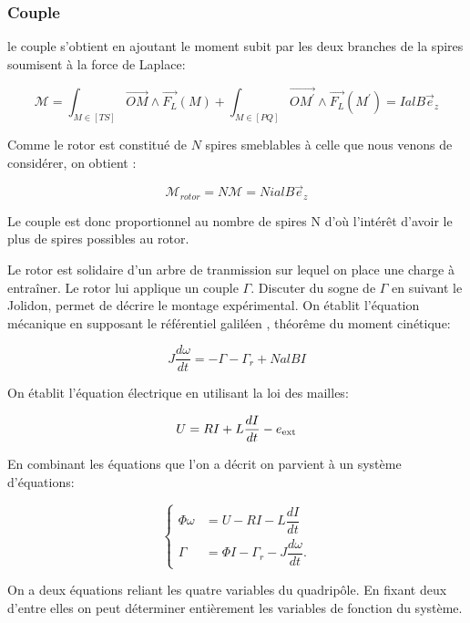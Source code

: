 \documentclass[french, a4paper, 10pt, twocolumn, landscape]{article}
\begin{document}
\subsubsection*{Couple}

le couple s'obtient en ajoutant le moment subit par les deux branches de la spires soumisent à la force de Laplace:

\begin{equation}
	\mathcal{M} = \int_{M\in[TS]}\vec{OM}\wedge\vec{F_L}(M)+\int_{M\in[PQ]}\vec{OM^\prime}\wedge\vec{F_L}(M^\prime)=IalB\vec{e}_z
\end{equation}

Comme le rotor est constitué de $N$ spires smeblables à celle que nous venons de considérer, on obtient : 

\begin{equation}
	\mathcal{M}_{rotor} = N\mathcal{M} = NialB\vec{e}_z
\end{equation}

Le couple est donc proportionnel au nombre de spires N d'où l'intérêt d'avoir le plus de spires possibles au rotor.\medskip

Le rotor est solidaire d'un arbre de tranmission sur lequel on place une charge à entraîner. Le rotor lui applique un couple $\Gamma$. Discuter du sogne de $\Gamma$ en suivant le Jolidon, permet de décrire le montage expérimental. On établit l'équation mécanique en supposant le référentiel galiléen , théorême du moment cinétique: 

\begin{equation}
	J\dfrac{d\omega}{dt}=-\Gamma-\Gamma_r+NalBI
\end{equation}

On établit l'équation électrique en utilisant la loi des mailles:

\begin{equation}
	U = RI+L\dfrac{dI}{dt}-e_{\rm ext}
\end{equation}

En combinant les équations que l'on a décrit on parvient à un système d'équations:

\begin{equation}
	\left\{
		\begin{array}{cc}
		\Phi\omega & = U-RI-L\dfrac{dI}{dt}\\
		\Gamma & = \Phi I-\Gamma_r-J\dfrac{d\omega}{dt}.
	\end{array}
	\right.
\end{equation}

On a deux équations reliant les quatre variables du quadripôle. En fixant deux d'entre elles on peut déterminer entièrement les variables de fonction du système.
\end{document}
